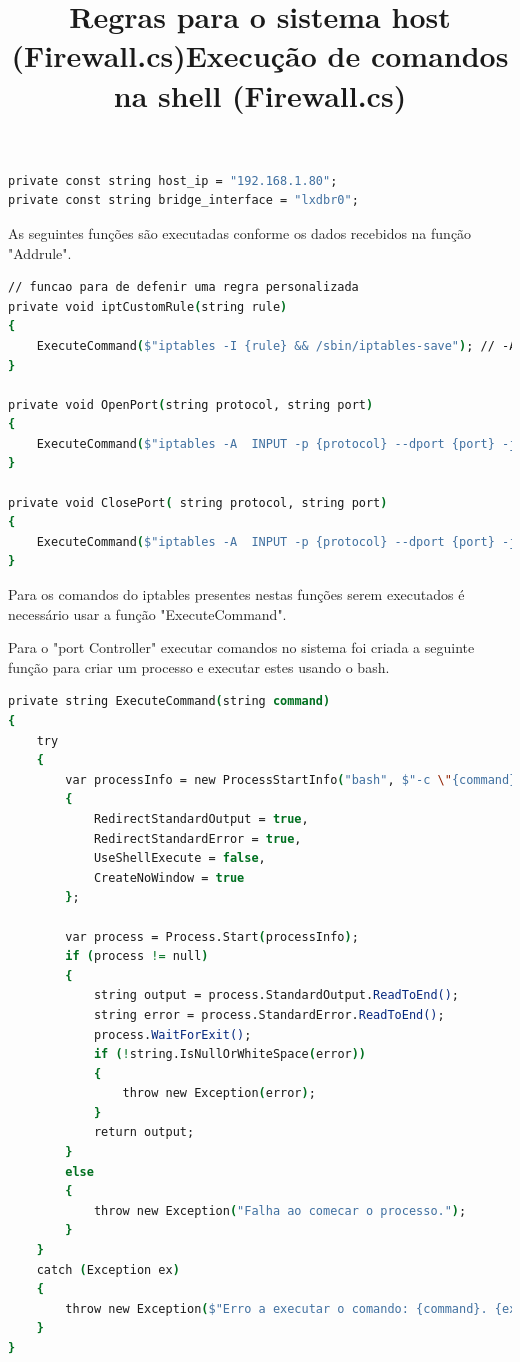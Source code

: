 \begin{lstlisting}[language=csh, caption={Constantes defenidas}]
private const string host_ip = "192.168.1.80";
private const string bridge_interface = "lxdbr0";
\end{lstlisting} 





\title*{\textbf{Regras para o sistema host (Firewall.cs)}}

As seguintes funções são executadas conforme os dados recebidos na função "Addrule".

\begin{lstlisting}[language=csh, caption={Funções para executar regras no Iptables}]
// funcao para de defenir uma regra personalizada 
private void iptCustomRule(string rule)
{
    ExecuteCommand($"iptables -I {rule} && /sbin/iptables-save"); // -A para adicionar no fundo da lista ou -I para adicionar ao topo da lista
}

private void OpenPort(string protocol, string port)
{
    ExecuteCommand($"iptables -A  INPUT -p {protocol} --dport {port} -j ACCEPT && /sbin/iptables-save");
}

private void ClosePort( string protocol, string port)
{
    ExecuteCommand($"iptables -A  INPUT -p {protocol} --dport {port} -j DROP && /sbin/iptables-save");
}
\end{lstlisting} 

Para os comandos do iptables presentes nestas funções serem executados é necessário
usar a função "ExecuteCommand".




\title*{\textbf{Execução de comandos na shell (Firewall.cs)}}


Para o "port Controller" executar comandos no sistema foi criada a seguinte função
para criar um processo e executar estes usando o bash. 

\begin{lstlisting}[language=csh, caption={Função que executa comandos na shell}]
private string ExecuteCommand(string command)
{
    try
    {
        var processInfo = new ProcessStartInfo("bash", $"-c \"{command}\"")
        {
            RedirectStandardOutput = true,
            RedirectStandardError = true,
            UseShellExecute = false,
            CreateNoWindow = true
        };

        var process = Process.Start(processInfo);
        if (process != null)
        {
            string output = process.StandardOutput.ReadToEnd();
            string error = process.StandardError.ReadToEnd();
            process.WaitForExit();
            if (!string.IsNullOrWhiteSpace(error))
            {
                throw new Exception(error);
            }
            return output;
        }
        else
        {
            throw new Exception("Falha ao comecar o processo.");
        }
    }
    catch (Exception ex)
    {
        throw new Exception($"Erro a executar o comando: {command}. {ex.Message}");
    }
}
\end{lstlisting} 




